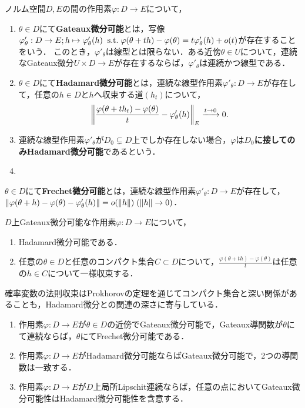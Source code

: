 \documentclass[uplatex,dvipdfmx]{jsreport}
\begin{document}
\begin{definition}
    ノルム空間$D,E$の間の作用素$\varphi:D\to E$について，
    \begin{enumerate}
        \item $\theta\in D$にて\textbf{Gateaux微分可能}とは，写像$\varphi'_\theta:D\to E;h\mapsto\varphi'_\theta(h)\;\;\mathrm{s.t.}\;\varphi(\theta+th)-\varphi(\theta)=t\varphi'_\theta(h)+o(t)$が存在することをいう．
        このとき，$\varphi'_\theta$は線型とは限らない．ある近傍$\theta\in U$について，連続なGateaux微分$U\times D\to E$が存在するならば，$\varphi'_\theta$は連続かつ線型である．
        \item $\theta\in D$にて\textbf{Hadamard微分可能}とは，連続な線型作用素$\varphi'_\theta:D\to E$が存在して，任意の$h\in D$と$h$へ収束する道$(h_t)$について，
        \[\left\|\frac{\varphi(\theta+th_t)-\varphi(\theta)}{t}-\varphi'_\theta(h)\right\|_E\xrightarrow{t\to0}0.\]
        \item 連続な線型作用素$\varphi'_\theta$が$D_0\subsetneq D$上でしか存在しない場合，$\varphi$は\textbf{$D_0$に接してのみHadamard微分可能}であるという．
        \item 
    \end{enumerate}$\theta\in D$にて\textbf{Frechet微分可能}とは，連続な線型作用素$\varphi'_\theta:D\to E$が存在して，$\|\varphi(\theta+h)-\varphi(\theta)-\varphi'_\theta(h)\|=o(\|h\|)\;(\|h\|\to0)$．
\end{definition}

\begin{lemma}[Hadamard微分可能性の特徴づけ]
    $D$上Gateaux微分可能な作用素$\varphi:D\to E$について，
    \begin{enumerate}
        \item Hadamard微分可能である．
        \item 任意の$\theta\in D$と任意のコンパクト集合$C\subset D$について，$\frac{\varphi(\theta+th)-\varphi(\theta)}{t}$は任意の$h\in C$について一様収束する．
    \end{enumerate}
\end{lemma}
\begin{remarks}
    確率変数の法則収束はProkhorovの定理を通じてコンパクト集合と深い関係があることも，Hadamard微分との関連の深さに寄与している．
\end{remarks}

\begin{lemma}[微分の強さの関係]\mbox{}
    \begin{enumerate}
        \item 作用素$\varphi:D\to E$が$\theta\in D$の近傍でGateaux微分可能で，Gateaux導関数が$\theta$にて連続ならば，$\theta$にてFrechet微分可能である．
        \item 作用素$\varphi:D\to E$がHadamard微分可能ならばGateaux微分可能で，2つの導関数は一致する．
        \item 作用素$\varphi:D\to E$が$D$上局所Lipschit連続ならば，任意の点においてGateaux微分可能性はHadamard微分可能性を含意する．
    \end{enumerate}
\end{lemma}
\end{document}

